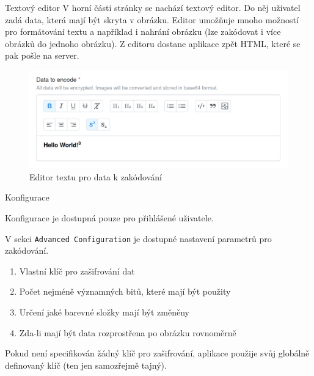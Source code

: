 \begin{subsubsection}{Textový editor}\label{subsubsec:textovy-editor}
V horní části stránky se nachází textový editor.
Do něj uživatel zadá data, která mají být skryta v obrázku.
Editor umožňuje mnoho možností pro formátování textu a například i nahrání
obrázku (lze zakódovat i více obrázků do jednoho obrázku).
Z editoru dostane aplikace zpět HTML, které se pak pošle na server.

\begin{figure}
    \centering
    \includegraphics[scale=0.5]{assets/images/encode-editor}
    \caption{Editor textu pro data k zakódování}\label{fig:editor-textu}
\end{figure}

\end{subsubsection}

\begin{subsubsection}{Konfigurace}\label{subsubsec:enc-konfigurace}

Konfigurace je dostupná pouze pro přihlášené uživatele.

V sekci \texttt{Advanced Configuration} je dostupné nastavení parametrů
pro zakódování.

\begin{enumerate}
    \item Vlastní klíč pro zašifrování dat
    \item Počet nejméně významných bitů, které mají být použity
    \item Určení jaké barevné složky mají být změněny
    \item Zda-li mají být data rozprostřena po obrázku rovnoměrně
\end{enumerate}

Pokud není specifikován žádný klíč pro zašifrování, aplikace použije
svůj globálně definovaný klíč (ten jen samozřejmě tajný).

\end{subsubsection}

